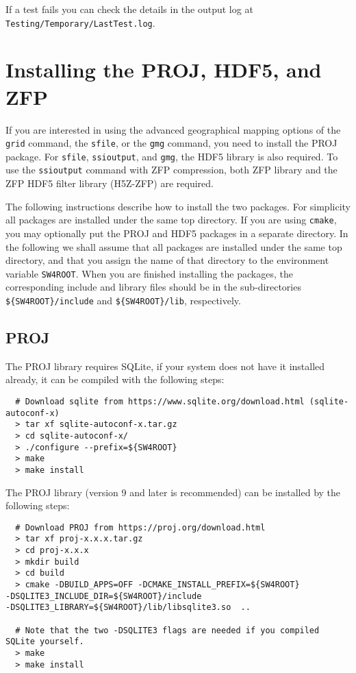 \documentclass[11pt]{article}
\begin{document}
If a test fails you can check the details in the output log at
\texttt{Testing/Temporary/LastTest.log}.

\section{Installing the PROJ, HDF5, and ZFP}\label{sec:proj}
 

If you are interested in using the advanced geographical mapping options of the {\tt grid} command, the {\tt sfile}, or the {\tt gmg} command, you need to install the PROJ package. For {\tt sfile}, {\tt ssioutput},  and {\tt gmg}, the HDF5 library is also required. To use the {\tt ssioutput} command with ZFP compression, both ZFP library and the ZFP HDF5 filter library (H5Z-ZFP) are required.  

The following instructions describe how to install the two packages. For simplicity all packages
are installed under the same top directory. If you are using {\tt cmake}, you may optionally put the
PROJ and HDF5 packages in a separate directory. In the following we shall assume that all packages are
installed under the same top directory, and that you assign the name of that directory to the
environment variable \verb+SW4ROOT+. When you are finished installing the packages, the
corresponding include and library files should be in the sub-directories \verb+${SW4ROOT}/include+
and \verb+${SW4ROOT}/lib+, respectively.

\subsection{PROJ}
The PROJ library requires SQLite, if your system does not have it installed already, it can be compiled with the following steps:
\begin{verbatim}
  # Download sqlite from https://www.sqlite.org/download.html (sqlite-autoconf-x)
  > tar xf sqlite-autoconf-x.tar.gz
  > cd sqlite-autoconf-x/
  > ./configure --prefix=${SW4ROOT}
  > make
  > make install
\end{verbatim}

The PROJ library (version 9 and later is recommended) can be installed by the following steps:

\begin{verbatim}
  # Download PROJ from https://proj.org/download.html
  > tar xf proj-x.x.x.tar.gz
  > cd proj-x.x.x
  > mkdir build
  > cd build
  > cmake -DBUILD_APPS=OFF -DCMAKE_INSTALL_PREFIX=${SW4ROOT}
-DSQLITE3_INCLUDE_DIR=${SW4ROOT}/include
-DSQLITE3_LIBRARY=${SW4ROOT}/lib/libsqlite3.so  ..

  # Note that the two -DSQLITE3 flags are needed if you compiled SQLite yourself.
  > make
  > make install
\end{verbatim}
\end{document}
